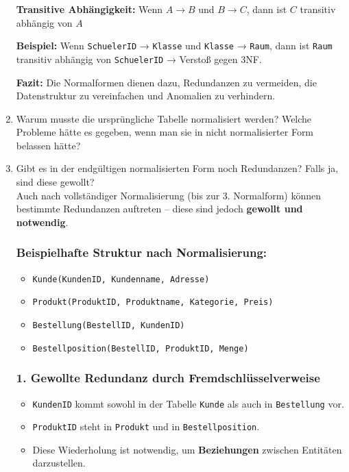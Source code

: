 \documentclass[a4paper,12pt]{article}
\begin{document}
\begin{enumerate}
		\textbf{Transitive Abhängigkeit:}  
		Wenn \( A \rightarrow B \) und \( B \rightarrow C \), dann ist \( C \) transitiv abhängig von \( A \)
		
		\textbf{Beispiel:}  
		Wenn \texttt{SchuelerID} → \texttt{Klasse} und \texttt{Klasse} → \texttt{Raum}, dann ist \texttt{Raum} transitiv abhängig von \texttt{SchuelerID} → Verstoß gegen 3NF.
		
		\vspace{1em}
		
		\textbf{Fazit:}  
		Die Normalformen dienen dazu, Redundanzen zu vermeiden, die Datenstruktur zu vereinfachen und Anomalien zu verhindern.
		
		\item Warum musste die ursprüngliche Tabelle normalisiert werden? Welche Probleme hätte es gegeben, wenn man sie in nicht normalisierter Form belassen hätte?
		\item Gibt es in der endgültigen normalisierten Form noch Redundanzen? Falls ja, sind diese gewollt?\\
		
		Auch nach vollständiger Normalisierung (bis zur 3. Normalform) können bestimmte Redundanzen auftreten – diese sind jedoch \textbf{gewollt und notwendig}.
		
		\subsubsection*{Beispielhafte Struktur nach Normalisierung:}
		
		\begin{itemize}
			\item \texttt{Kunde(KundenID, Kundenname, Adresse)}
			\item \texttt{Produkt(ProduktID, Produktname, Kategorie, Preis)}
			\item \texttt{Bestellung(BestellID, KundenID)}
			\item \texttt{Bestellposition(BestellID, ProduktID, Menge)}
		\end{itemize}
		
		\subsubsection*{1. Gewollte Redundanz durch Fremdschlüsselverweise}
		
		\begin{itemize}
			\item \texttt{KundenID} kommt sowohl in der Tabelle \texttt{Kunde} als auch in \texttt{Bestellung} vor.
			\item \texttt{ProduktID} steht in \texttt{Produkt} und in \texttt{Bestellposition}.
			\item Diese Wiederholung ist notwendig, um \textbf{Beziehungen} zwischen Entitäten darzustellen.
		\end{itemize}
		

\end{enumerate}
\end{document}

